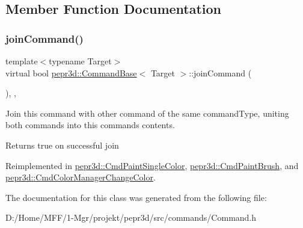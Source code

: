 \subsection{Member Function Documentation}
\mbox{\label{classpepr3d_1_1_command_base_a9ef408154b7cb446e626e049f268abb4}} 
\subsubsection{\texorpdfstring{joinCommand()}{joinCommand()}}
{\footnotesize\ttfamily template$<$typename Target$>$ \\
virtual bool \mbox{\hyperlink{classpepr3d_1_1_command_base}{pepr3d\+::\+Command\+Base}}$<$ Target $>$\+::join\+Command (\begin{DoxyParamCaption}\item[{const \mbox{\hyperlink{classpepr3d_1_1_command_base}{Command\+Base}}$<$ Target $>$ \&}]{ }\end{DoxyParamCaption})\hspace{0.3cm}{\ttfamily [inline]}, {\ttfamily [protected]}, {\ttfamily [virtual]}}



Join this command with other command of the same command\+Type, uniting both commands into this command\textquotesingle{}s contents. 

\begin{DoxyReturn}{Returns}
true on successful join 
\end{DoxyReturn}


Reimplemented in \mbox{\hyperlink{classpepr3d_1_1_cmd_paint_single_color_a99945a65b5efae3151ebdbae619f3eed}{pepr3d\+::\+Cmd\+Paint\+Single\+Color}}, \mbox{\hyperlink{classpepr3d_1_1_cmd_paint_brush_a05e6c87b7cd47b72150e05f2ee584ee8}{pepr3d\+::\+Cmd\+Paint\+Brush}}, and \mbox{\hyperlink{classpepr3d_1_1_cmd_color_manager_change_color_a0c77133a022d16d1aa55ba477dade531}{pepr3d\+::\+Cmd\+Color\+Manager\+Change\+Color}}.



The documentation for this class was generated from the following file\+:\begin{DoxyCompactItemize}
\item 
D\+:/\+Home/\+M\+F\+F/1-\/\+Mgr/projekt/pepr3d/src/commands/Command.\+h\end{DoxyCompactItemize}
